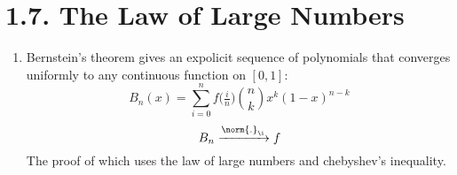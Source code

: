 \documentclass{pset}
\begin{document}
\maketitle

\pagebreak 
\section{1.7. The Law of Large Numbers}
\begin{enumerate}
    \item Bernstein's theorem gives an expolicit sequence of polynomials that converges uniformly to any continuous function on $[0, 1]$:
    \[B_n(x) = \sum_{i=0}^n f\bigl(\tfrac{i}{n}\bigr) {n \choose k} x^k(1-x)^{n-k}\]
    \[B_n \xrightarrow{\norm{.}_\i} f\]
    The proof of which uses the law of large numbers and chebyshev's inequality.
\end{enumerate}
\end{document}
